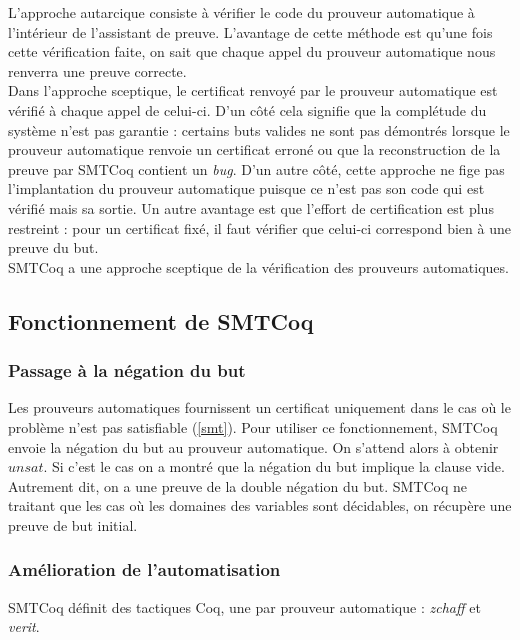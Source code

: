 \documentclass[11pt]{article}
\begin{document}
L'approche autarcique consiste à vérifier le code du prouveur automatique à l'intérieur de l'assistant de preuve. L'avantage de cette méthode est qu'une fois cette vérification faite, on sait que chaque appel du prouveur automatique nous renverra une preuve correcte. \\

Dans l'approche sceptique, le certificat renvoyé par le prouveur automatique est vérifié à chaque appel de celui-ci. D'un côté cela signifie que la complétude du système n'est pas garantie : certains buts valides ne sont pas démontrés lorsque le prouveur automatique renvoie un certificat erroné ou que la reconstruction de la preuve par SMTCoq contient un \textit{bug}. D'un autre côté, cette approche ne fige pas l'implantation du prouveur automatique puisque ce n'est pas son code qui est vérifié mais sa sortie. Un autre avantage est que l'effort de certification est plus restreint : pour un certificat fixé, il faut vérifier que celui-ci correspond bien à une preuve du but.\\

SMTCoq a une approche sceptique de la vérification des prouveurs automatiques.

\subsection{Fonctionnement de SMTCoq}

\subsubsection{Passage à la négation du but} \label{negation}

Les prouveurs automatiques fournissent un certificat uniquement dans le cas où le problème n'est pas satisfiable (\ref{smt}). Pour utiliser ce fonctionnement, SMTCoq envoie la négation du but au prouveur automatique. On s'attend alors à obtenir $unsat$. Si c'est le cas on a montré que la négation du but implique la clause vide. Autrement dit, on a une preuve de la double négation du but. SMTCoq ne traitant que les cas où les domaines des variables sont décidables, on récupère une preuve de but initial.


\subsubsection{Amélioration de l'automatisation}

SMTCoq définit des tactiques Coq, une par prouveur automatique : \textit{zchaff} et \textit{verit}. \\
\end{document}
